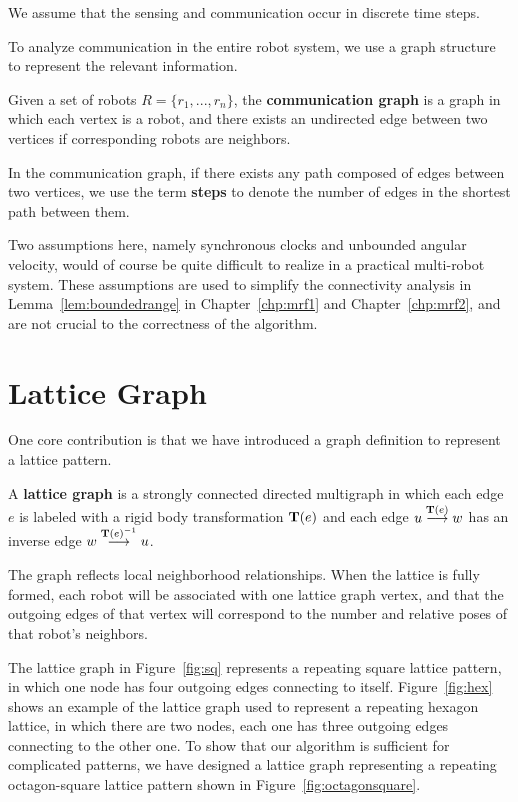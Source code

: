 We assume that the sensing and communication occur in discrete time steps. 

To analyze communication in the entire robot system, we use a graph structure to represent the relevant information.

\begin{defn}
  Given a set of robots $R =\{r_1, ..., r_n\}$, the \textbf{communication
  graph} is a graph in which each vertex is a robot, and there exists an
  undirected edge between two vertices if corresponding robots are neighbors.
\end{defn}

In the communication graph, if there exists any path composed of edges between two vertices, we use the term
\textbf{steps} to denote the number of edges in the shortest path between
them.

Two assumptions here, namely synchronous clocks and unbounded angular velocity, 
would of course be quite difficult to realize in a practical multi-robot system. 
%
These assumptions are used to simplify the connectivity analysis in Lemma~\ref{lem:boundedrange} in Chapter~\ref{chp:mrf1} and Chapter~\ref{chp:mrf2}, 
and are not crucial to the correctness of the algorithm.


\section{Lattice Graph}
\label{sec:latt-graph}
One core contribution is that we have introduced a graph definition to represent a lattice pattern.
%
\begin{defn}
  \label{def:latticegraph}
  A \textbf{lattice graph} is a strongly connected directed multigraph in which
  each edge $e$ is labeled with a rigid body transformation $\mathbf{T}(e)$ and each edge
  ${u}\overset{\mathbf{T}(e)}{\longrightarrow}{w}$ has an inverse edge ${w}\overset{\mathbf{T}(e)^{-1}}{\longrightarrow}{u}$.
\end{defn}


The graph reflects local neighborhood relationships. 
When the lattice is fully formed, each robot will be
associated with one lattice graph vertex, and that the outgoing edges of that
vertex will correspond to the number and relative poses of that robot's
neighbors.


The lattice graph in Figure~\ref{fig:sq} represents a repeating square lattice pattern, 
in which one node has four outgoing edges connecting to itself. 
%
Figure~\ref{fig:hex} shows an example of the lattice graph used to represent a
repeating hexagon lattice, in which there are two nodes, each one has three outgoing edges connecting to the other one. 
%
To show that our algorithm is sufficient for complicated patterns, 
we have designed a lattice graph representing a repeating octagon-square lattice pattern shown in Figure~\ref{fig:octagonsquare}.
%

